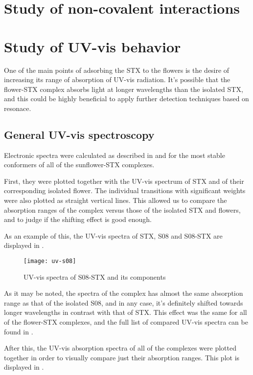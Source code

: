 \section{Study of non-covalent interactions}
\blindtext

\section{Study of UV-vis behavior}
One of the main points of adsorbing the STX to the flowers is the desire of increasing its range of absorption of UV-vis radiation.
It's possible that the flower-STX complex absorbs light at longer wavelengths than the isolated STX, and this could be highly beneficial to apply further detection techniques based on resonace.

\subsection{General UV-vis spectroscopy}
Electronic spectra were calculated as described in  and  for the most stable conformers of all of the sunflower-STX complexes.

First, they were plotted together with the UV-vis spectrum of STX and of their corresponding isolated flower.
The individual transitions with significant weights were also plotted as straight vertical lines.
This allowed us to compare the absorption ranges of the complex versus those of the isolated STX and flowers, and to judge if the shifting effect is good enough.

As an example of this, the UV-vis spectra of STX, S08 and S08-STX are displayed in .

\begin{figure}
    \texttt{[image: uv-s08]}
    \caption[UV-vis spectrum of S08-STX]{UV-vis spectra of S08-STX and its components}
\end{figure}

As it may be noted, the spectra of the complex has almost the same absorption range as that of the isolated S08, and in any case, it's definitely shifted towards longer wavelengths in contrast with that of STX.
This effect was the same for all of the flower-STX complexes, and the full list of compared UV-vis spectra can be found in .

After this, the UV-vis absorption spectra of all of the complexes were plotted together in order to visually compare just their absorption ranges. This plot is displayed in .

